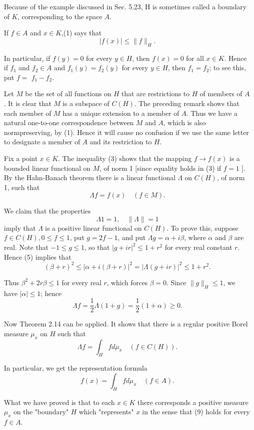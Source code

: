 Because of the example discussed in Sec. 5.23, $\mathrm{H}$ is sometimes called a boundary of $K$, corresponding to the space $A$.

If $f \in A$ and $x \in K$,(1) says that
$$
|f(x)| \leq\|f\|_H .
$$

In particular, if $f(y)=0$ for every $y \in H$, then $f(x)=0$ for all $x \in K$. Hence if $f_1$ and $f_2 \in A$ and $f_1(y)=f_2(y)$ for every $y \in H$, then $f_1=f_2$; to see this, put $f=$ $f_1-f_2$.

Let $M$ be the set of all functions on $H$ that are restrictions to $H$ of members of $A$. It is clear that $M$ is a subspace of $C(H)$. The preceding remark shows that each member of $M$ has a unique extension to a member of $A$. Thus we have a natural one-to-one correspondence between $M$ and $A$, which is also normpreserving, by (1). Hence it will cause no confusion if we use the same letter to designate a member of $A$ and its restriction to $H$.

Fix a point $x \in K$. The inequality (3) shows that the mapping $f \rightarrow f(x)$ is a bounded linear functional on $M$, of norm 1 [since equality holds in (3) if $f=1$ ]. By the Hahn-Banach theorem there is a linear functional $\Lambda$ on $C(H)$, of norm 1, such that
$$
\Lambda f=f(x) \quad(f \in M) .
$$

We claim that the properties
$$
\Lambda 1=1, \quad\|\Lambda\|=1
$$
imply that $\Lambda$ is a positive linear functional on $C(H)$.
To prove this, suppose $f \in C(H), 0 \leq f \leq 1$, put $g=2 f-1$, and put $\Lambda g=\alpha+i \beta$, where $\alpha$ and $\beta$ are real. Note that $-1 \leq g \leq 1$, so that $|g+i r|^2 \leq 1+r^2$ for every real constant $r$. Hence (5) implies that
$$
(\beta+r)^2 \leq|\alpha+i(\beta+r)|^2=|\Lambda(g+i r)|^2 \leq 1+r^2 .
$$

Thus $\beta^2+2 r \beta \leq 1$ for every real $r$, which forces $\beta=0$. Since $\|g\|_H \leq 1$, we have $|\alpha| \leq 1$; hence
$$
\Lambda f=\frac{1}{2} \Lambda(1+g)=\frac{1}{2}(1+\alpha) \geq 0 .
$$

Now Theorem 2.14 can be applied. It shows that there is a regular positive Borel measure $\mu_x$ on $H$ such that
$$
\Lambda f=\int_H f d \mu_x \quad(f \in C(H)) .
$$

In particular, we get the representation formula
$$
f(x)=\int_H f d \mu_x \quad(f \in A) .
$$

What we have proved is that to each $x \in K$ there corresponds a positive measure $\mu_x$ on the "boundary" $H$ which "represents" $x$ in the sense that (9) holds for every $f \in A$.

